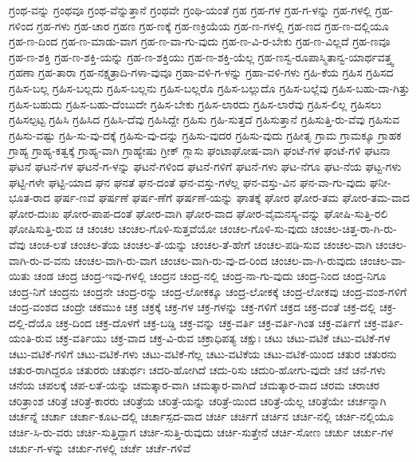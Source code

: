 {ಗ್ರಂಥ-ವನ್ನು
ಗ್ರಂಥವೂ
ಗ್ರಂಥ-ವೆನ್ನುತ್ತಾನೆ
ಗ್ರಂಥವೇ
ಗ್ರಂಥಿ-ಯಂತೆ
ಗ್ರಹ
ಗ್ರಹ-ಗಳ
ಗ್ರಹ-ಗ-ಳನ್ನು
ಗ್ರಹ-ಗಳಲ್ಲಿ
ಗ್ರಹ-ಗಳಿಂದ
ಗ್ರಹ-ಗಳು
ಗ್ರಹ-ಚಾರ
ಗ್ರಹಣ
ಗ್ರಹ-ಣಕ್ಕೆ
ಗ್ರಹ-ಣಕ್ರಿಯೆಯ
ಗ್ರಹ-ಣ-ಗಳಲ್ಲಿ
ಗ್ರಹ-ಣದ
ಗ್ರಹ-ಣ-ದಲ್ಲಿಯೂ
ಗ್ರಹ-ಣ-ದಿಂದ
ಗ್ರಹ-ಣ-ಮಾಡು-ವಾಗ
ಗ್ರಹ-ಣ-ವಾ-ಗು-ವುದು
ಗ್ರಹ-ಣ-ವಿ-ರ-ಬೇಕು
ಗ್ರಹ-ಣ-ವಿಲ್ಲದೆ
ಗ್ರಹ-ಣವೂ
ಗ್ರಹ-ಣ-ಶಕ್ತಿ
ಗ್ರಹ-ಣ-ಶಕ್ತಿ-ಯನ್ನು
ಗ್ರಹ-ಣ-ಶಕ್ತಿಯು
ಗ್ರಹ-ಣ-ಶಕ್ತಿ-ಯೆಲ್ಲ
ಗ್ರಹ-ಣಸ್ವ-ರೂಪಾಸ್ಮಿತಾನ್ವ-ಯಾರ್ಥವತ್ತ್ವ
ಗ್ರಹಣಾ
ಗ್ರಹ-ತಾರಾ
ಗ್ರಹ-ನಕ್ಷತ್ರಾದಿ-ಗಳಾ-ವುವೂ
ಗ್ರಹಾ-ವಳಿ-ಗ-ಳನ್ನು
ಗ್ರಹಾ-ವಳಿ-ಗಳು
ಗ್ರಹಿ-ಕೆಯ
ಗ್ರಹಿಸ
ಗ್ರಹಿಸದ
ಗ್ರಹಿಸ-ಬಲ್ಲ
ಗ್ರಹಿಸ-ಬಲ್ಲದು
ಗ್ರಹಿಸ-ಬಲ್ಲನು
ಗ್ರಹಿಸ-ಬಲ್ಲರೊ
ಗ್ರಹಿಸ-ಬಲ್ಲುದೊ
ಗ್ರಹಿಸ-ಬಲ್ಲೆವು
ಗ್ರಹಿಸ-ಬಹು-ದಾ-ಗಿತ್ತು
ಗ್ರಹಿಸ-ಬಹುದು
ಗ್ರಹಿಸ-ಬಹು-ದೆಂಬುದೇ
ಗ್ರಹಿಸ-ಬೇಕು
ಗ್ರಹಿಸ-ಲಾರದು
ಗ್ರಹಿಸ-ಲಾರೆವು
ಗ್ರಹಿಸ-ಲಿಲ್ಲ
ಗ್ರಹಿಸಲು
ಗ್ರಹಿಸಲ್ಪಟ್ಟ
ಗ್ರಹಿಸಿ
ಗ್ರಹಿಸಿದ
ಗ್ರಹಿಸಿ-ದೆವು
ಗ್ರಹಿಸಿದ್ದೇ
ಗ್ರಹಿಸು
ಗ್ರಹಿ-ಸುತ್ತದೆ
ಗ್ರಹಿಸುತ್ತಾನೆ
ಗ್ರಹಿಸುತ್ತಿ-ರು-ವೆವು
ಗ್ರಹಿಸುವ
ಗ್ರಹಿಸು-ವಷ್ಟು
ಗ್ರಹಿ-ಸು-ವು-ದಕ್ಕೆ
ಗ್ರಹಿಸು-ವು-ದನ್ನು
ಗ್ರಹಿಸು-ವುದರ
ಗ್ರಹಿಸು-ವುದು
ಗ್ರಹೀತೃ
ಗ್ರಾಮ
ಗ್ರಾಮಕ್ಕೂ
ಗ್ರಾಹಕ
ಗ್ರಾಹ್ಯ
ಗ್ರಾಹ್ಯ-ಕತ್ವಕ್ಕೆ
ಗ್ರಾಹ್ಯ-ವಾಗಿ
ಗ್ರಾಹ್ಯೇಷು
ಗ್ರೀಕ್
ಗ್ಲಾಸು
ಘಂಟಾಘೋಷ-ವಾಗಿ
ಘಂಟೆ-ಗಳ
ಘಂಟೆ-ಗಳಿ
ಘಟನಾ
ಘಟನೆ
ಘಟನೆ-ಗಳ
ಘಟನೆ-ಗ-ಳನ್ನು
ಘಟನೆ-ಗಳಿಂದ
ಘಟನೆ-ಗಳಿಗೆ
ಘಟನೆ-ಗಳು
ಘಟ-ನೆಗೂ
ಘಟ-ನೆಯ
ಘಟ್ಟ-ಗಳು
ಘಟ್ಟಿ-ಗಳೇ
ಘಟ್ಟಿ-ಯಾದ
ಘನ
ಘನತೆ
ಘನ-ದಂತೆ
ಘನ-ವಸ್ತು-ಗಳೆಲ್ಲ
ಘನ-ವಸ್ತು-ವಿನ
ಘನ-ವಾ-ಗು-ವುದು
ಘನೀ-ಭೂತ-ರಾದ
ಘರ್ಷ-ಣವೆ
ಘರ್ಷಣೆ
ಘರ್ಷ-ಣೆಗೆ
ಘರ್ಷಣೆ-ಯನ್ನು
ಘಾತಕ್ಕೆ
ಘೋರ
ಘೋರ-ತಮ
ಘೋರ-ತಮ-ವಾದ
ಘೋರ-ದುಃಖ
ಘೋರ-ಪಾಪ-ದಂತೆ
ಘೋರ-ವಾಗಿ
ಘೋರ-ವಾದ
ಘೋರ-ವೈಮನಸ್ಯ-ವನ್ನು
ಘೋಷಿ-ಸುತ್ತಿ-ರಲಿ
ಘೋಷಿಸುತ್ತಿ-ರುವ
ಚ
ಚಂಚಲ
ಚಂಚಲ-ಗೊಳಿ-ಸುತ್ತವೆಯೋ
ಚಂಚಲ-ಗೊಳಿ-ಸು-ವುದು
ಚಂಚಲ-ಚಿತ್ತ-ರಾ-ಗಿ-ರು-ವೆವು
ಚಂಚ-ಲತೆ
ಚಂಚಲ-ತೆಯ
ಚಂಚಲ-ತೆ-ಯನ್ನು
ಚಂಚಲ-ತೆ-ಹೇಗೆ
ಚಂಚಲ-ಪಡಿ-ಸುವ
ಚಂಚಲ-ವಾಗಿ
ಚಂಚಲ-ವಾಗಿ-ರು-ವ-ವನು
ಚಂಚಲ-ವಾಗಿ-ರು-ವಾಗ
ಚಂಚಲ-ವಾಗಿ-ರು-ವು-ದ-ರಿಂದ
ಚಂಚಲ-ವಾ-ಗಿ-ರುವುದು
ಚಂಚಲ-ವಾ-ಯಿತು
ಚಂಡ
ಚಂದ್ರ
ಚಂದ್ರ-ಇವು-ಗಳಲ್ಲಿ
ಚಂದ್ರನ
ಚಂದ್ರ-ನಲ್ಲಿ
ಚಂದ್ರ-ನಾ-ಗು-ವುದು
ಚಂದ್ರ-ನಿಂದ
ಚಂದ್ರ-ನಿಗೂ
ಚಂದ್ರ-ನಿಗೆ
ಚಂದ್ರನು
ಚಂದ್ರನೇ
ಚಂದ್ರ-ರನ್ನು
ಚಂದ್ರ-ಲೋಕಕ್ಕೂ
ಚಂದ್ರ-ಲೋಕಕ್ಕೆ
ಚಂದ್ರ-ಲೋಕವು
ಚಂದ್ರ-ವಂಶ-ಗಳಿಗೆ
ಚಂದ್ರ-ವಂಶದ
ಚಂದ್ರೇ
ಚಕಮುಕಿ
ಚಕ್ರ
ಚಕ್ರಕ್ಕೆ
ಚಕ್ರ-ಗಳ
ಚಕ್ರ-ಗಳನ್ನು
ಚಕ್ರ-ಗಳಿಗೆ
ಚಕ್ರದ
ಚಕ್ರ-ದಂತೆ
ಚಕ್ರ-ದಲ್ಲಿ
ಚಕ್ರ-ದಲ್ಲಿ-ದೆಯೊ
ಚಕ್ರ-ದಿಂದ
ಚಕ್ರ-ದೊಳಗೆ
ಚಕ್ರ-ಬಡ್ಡಿ
ಚಕ್ರ-ವನ್ನು
ಚಕ್ರ-ವರ್ತಿ
ಚಕ್ರ-ವರ್ತಿ-ಗಿಂತ
ಚಕ್ರ-ವರ್ತಿಗೆ
ಚಕ್ರ-ವರ್ತಿ-ಯಂತಿ-ರುವ
ಚಕ್ರ-ವರ್ತಿಯು
ಚಕ್ರ-ವಾದ
ಚಕ್ರ-ವಿ-ರುವ
ಚಕ್ರಾಧಿಪತ್ಯ
ಚಕ್ಷುಃ
ಚಟು
ಚಟು-ವಟಿಕೆ
ಚಟು-ವಟಿಕೆ-ಗಳ
ಚಟು-ವಟಿಕೆ-ಗಳಿಗೆ
ಚಟು-ವಟಿಕೆ-ಗಳು
ಚಟು-ವಟಿಕೆ-ಗೆಲ್ಲ
ಚಟು-ವಟಿಕೆಯ
ಚಟು-ವಟಿಕೆ-ಯಿಂದ
ಚತುರ
ಚತುರನು
ಚತುರ-ರಾಗಿದ್ದರೂ
ಚತುರರು
ಚತುರ್ಥಃ
ಚದರಿ-ಹೋಗಿದೆ
ಚದು-ರಿಸು
ಚದುರಿ-ಹೋಗು-ವುದೇ
ಚನೆ
ಚನೆ-ಗಳು
ಚನೆಯ
ಚಪಲಕ್ಕೆ
ಚಪ-ಲತೆ-ಯನ್ನು
ಚಮತ್ಕಾರ-ವಾಗಿ
ಚಮತ್ಕಾರ-ವಾಗಿದೆ
ಚಮತ್ಕಾರ-ವಾದ
ಚರಮ
ಚರಾಚರ
ಚರಿತ್ರಾಂಶ
ಚರಿತ್ರೆ
ಚರಿತ್ರೆ-ಕಾರರು
ಚರಿತ್ರೆಯ
ಚರಿತ್ರೆ-ಯನ್ನು
ಚರಿತ್ರೆ-ಯಿಂದ
ಚರಿತ್ರೆ-ಯೆಲ್ಲ
ಚರಿತ್ರೆಯೇ
ಚರ್ಚನ್ನಾಗಿ
ಚರ್ಚನ್ನೆ
ಚರ್ಚಾ
ಚರ್ಚಾ-ಕೂಟ-ದಲ್ಲಿ
ಚರ್ಚಾಸ್ಪದ-ವಾದ
ಚರ್ಚಿ
ಚರ್ಚಿಗೆ
ಚರ್ಚಿನ
ಚರ್ಚಿ-ನಲ್ಲಿ
ಚರ್ಚಿ-ನಲ್ಲಿಯೂ
ಚರ್ಚಿ-ಸಿ-ರು-ವರು
ಚರ್ಚಿ-ಸುತ್ತಿದ್ದಾಗ
ಚರ್ಚಿ-ಸುತ್ತಿ-ರುವುದು
ಚರ್ಚಿ-ಸುತ್ತೇನೆ
ಚರ್ಚಿ-ಸೋಣ
ಚರ್ಚು
ಚರ್ಚು-ಗಳ
ಚರ್ಚು-ಗ-ಳನ್ನು
ಚರ್ಚು-ಗಳಲ್ಲಿ
ಚರ್ಚೆ
ಚರ್ಚೆ-ಗಳಿವೆ
}
